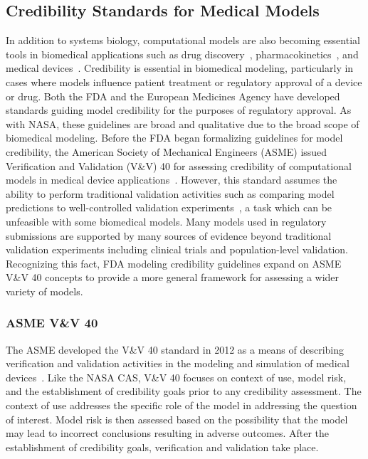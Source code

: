 \documentclass[12pt]{report}
\begin{document}
\subsection{Credibility Standards for Medical Models}
In addition to systems biology, computational models are also becoming essential tools in biomedical applications such as drug discovery~\cite{Chen2015}, pharmacokinetics~\cite{Kuh2000}, and medical devices~\cite{Kung2019}. Credibility is essential in biomedical modeling, particularly in cases where models influence patient treatment or regulatory approval of a device or drug. Both the FDA and the European Medicines Agency have developed standards guiding model credibility for the purposes of regulatory approval. As with NASA, these guidelines are broad and qualitative due to the broad scope of biomedical modeling. Before the FDA began formalizing guidelines for model credibility, the American Society of Mechanical Engineers (ASME) issued Verification and Validation (V\&V) 40 for assessing credibility of computational models in medical device applications~\cite{viceconti_credibility_2020}. However, this standard assumes the ability to perform traditional validation activities such as comparing model predictions to well-controlled validation experiments~\cite{FDAguidelines}, a task which can be unfeasible with some biomedical models. Many models used in regulatory submissions are supported by many sources of evidence beyond traditional validation experiments including clinical trials and population-level validation. Recognizing this fact, FDA modeling credibility guidelines expand on ASME V\&V 40 concepts to provide a more general framework for assessing a wider variety of models.


\subsubsection{ASME V\&V 40}

The ASME developed the V\&V 40 standard in 2012 as a means of describing verification and validation activities in the modeling and simulation of medical devices~\cite{viceconti_credibility_2020}. Like the NASA CAS, V\&V 40 focuses on context of use, model risk, and the establishment of credibility goals prior to any credibility assessment. The context of use addresses the specific role of the model in addressing the question of interest. Model risk is then assessed based on the possibility that the model may lead to incorrect conclusions resulting in adverse outcomes. After the establishment of credibility goals, verification and validation take place. 
\end{document}
